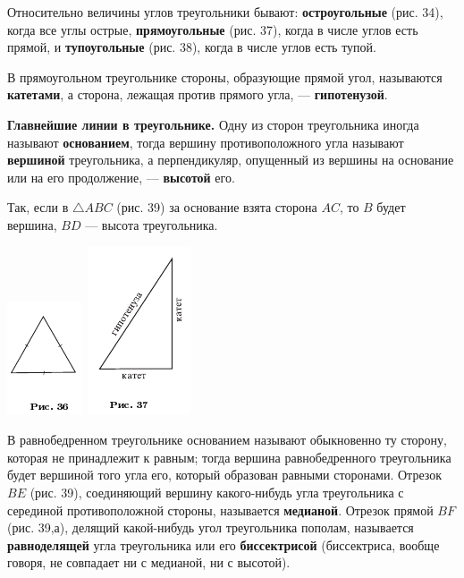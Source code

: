 \documentclass[oneside]{book}
\begin{document}
Относительно величины углов треугольники бывают:
\textbf{остроугольные} (рис. 34), когда все углы острые, \textbf{прямоугольные} (рис. 37), когда в числе углов есть прямой, и \textbf{тупоугольные} (рис. 38), когда в числе углов есть тупой.

В прямоугольном треугольнике стороны, образующие прямой угол, называются \textbf{катетами}, а сторона, лежащая против прямого угла, — \textbf{гипотенузой}.

\textbf{Главнейшие линии в треугольнике.}
Одну из сторон треугольника иногда называют \textbf{основанием}, тогда вершину противоположного угла называют \textbf{вершиной} треугольника, а перпендикуляр, опущенный из вершины на основание или на его продолжение, — \textbf{высотой} его.

Так, если в $\triangle ABC$ (рис. 39) за основание взята сторона $AC$, то $B$ будет вершина, $BD$ — высота треугольника.

\includegraphics{pics/ris-36}
\includegraphics{pics/ris-37}

В равнобедренном треугольнике основанием называют обыкновенно ту сторону, которая не принадлежит к равным;
тогда вершина равнобедренного треугольника будет вершиной того угла его, который образован равными сторонами.
Отрезок $BE$ (рис. 39), соединяющий вершину какого-нибудь угла треугольника с серединой противоположной стороны, называется \textbf{медианой}.
Отрезок прямой $BF$ (рис. 39,а), делящий какой-нибудь угол треугольника пополам, называется \textbf{равноделящей} угла треугольника или его \textbf{биссектрисой} (биссектриса, вообще говоря, не совпадает ни с медианой, ни с высотой).
\end{document}

